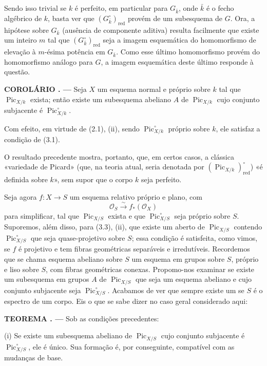\documentclass[11pt,twoside,openany]{book}
\numberwithin{equation}{section}
\newcommand{\src}[1]{%
  \phantomsection\hypertarget{src:#1}{}%
  \marginpar{\raggedleft\footnotesize\sffamily #1}%
}
\theoremstyle{plain}
\theoremstyle{definition}
\theoremstyle{remark}
\newcommand{\result}[2]{%
  \par\medskip\noindent\textbf{#1%
  \if\relax\detokenize{#2}\relax\else\space#2\fi. ---}\enspace
}
\newcommand{\FgaUnitKey}{frontmatter}
\renewcommand{\src}[1]{%
  \phantomsection\hypertarget{src:\FgaUnitKey:#1}{}%
  \marginpar{\raggedleft\footnotesize\sffamily #1}%
}
\begin{document}
Sendo isso trivial se $k$ é perfeito, em particular para $G_{\bar k}$, onde
$\bar k$ é o fecho algébrico de $k$, basta ver que
$(G_{\bar k}^\circ)_{\mathrm{red}}$ provém de um subesquema de $G$. Ora, a
hipótese sobre $G_{\bar k}$ (ausência de componente aditiva) resulta facilmente que existe um inteiro
$m$ tal que $(G_{\bar k}^\circ)_{\mathrm{red}}$ seja a imagem esquemática do
homomorfismo de elevação à $m$-ésima potência em $G_{\bar k}$. Como esse último
homomorfismo provém do homomorfismo análogo para $G$, a imagem esquemática deste
último responde à questão.

\result{COROLÁRIO}{3.2} Seja $X$ um esquema normal e próprio sobre $k$ tal que
$\operatorname{Pic}_{X/k}$ exista; então existe um subesquema abeliano $A$ de
$\operatorname{Pic}_{X/k}$ cujo conjunto subjacente é
$\operatorname{Pic}_{X/k}^\circ$.

Com efeito, em virtude de (2.1), (ii), sendo
$\operatorname{Pic}_{X/k}^\circ$ próprio sobre $k$, ele satisfaz a condição de
(3.1).
\src{237}
O resultado precedente mostra, portanto, que, em certos casos, a clássica
«variedade de Picard» (que, na teoria atual, seria denotada por
$(\operatorname{Pic}_{X/k})_{\mathrm{red}}^\circ$) «é definida sobre $k$»,
sem supor que o corpo $k$ seja perfeito.

Seja agora $f:X\longrightarrow S$ um esquema relativo próprio e plano, com
\[
\mathcal O_S\xrightarrow{\sim}f_*(\mathcal O_X)
\]
para simplificar, tal que $\operatorname{Pic}_{X/S}$ exista e que
$\operatorname{Pic}_{X/S}^\circ$ seja próprio sobre $S$. Suporemos, além
disso, para (3.3), (ii), que existe um aberto de $\operatorname{Pic}_{X/S}$
contendo $\operatorname{Pic}_{X/S}^\circ$ que seja quase-projetivo sobre $S$;
essa condição é satisfeita, como vimos, se $f$ é projetivo e tem fibras
geométricas separáveis e irredutíveis. Recordemos que se chama esquema
abeliano sobre $S$ um esquema em grupos sobre $S$, próprio e liso sobre
$S$, com fibras geométricas conexas. Propomo-nos
examinar se existe um subesquema em grupos $A$ de
$\operatorname{Pic}_{X/S}$ que seja um esquema abeliano e cujo conjunto
subjacente seja $\operatorname{Pic}_{X/S}^\circ$. Acabamos de ver que sempre
existe um se $S$ é o espectro de um corpo. Eis o que se sabe dizer no caso
geral considerado aqui:

\result{TEOREMA}{3.3} Sob as condições precedentes:

\noindent(i) Se existe um subesquema abeliano de
$\operatorname{Pic}_{X/S}$ cujo conjunto subjacente é
$\operatorname{Pic}_{X/S}^\circ$, ele é único. Sua formação é, por
conseguinte, compatível com as mudanças de base.
\end{document}
